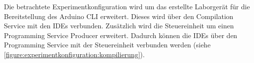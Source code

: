 Die betrachtete Experimentkonfiguration wird um das erstellte Laborgerät für die Bereitstellung des Arduino CLI erweitert. Dieses wird über den Compilation Service mit den IDEs verbunden. Zusätzlich wird die Steuereinheit um einen Programming Service Producer erweitert. Dadurch können die IDEs über den Programming Service mit der Steuereinheit verbunden werden (siehe \autoref{figure:experimentkonfiguration:kompilierung}).